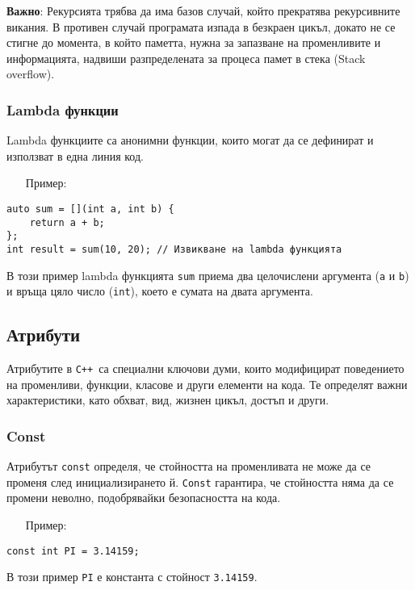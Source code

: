 \documentclass[oneside]{book}
\newcommand*{\code}[1]{\texttt{#1}}
\newcommand*{\cpp}{\texttt{C++}\ }
\begin{document}
\textbf{Важно}: Рекурсията трябва да има базов случай, който прекратява рекурсивните викания. В противен случай програмата изпада в безкраен цикъл, докато не се стигне до момента, в който паметта, нужна за запазване на променливите и информацията, надвиши разпределената за процеса памет в стека (Stack overflow).

\subsubsection{Lambda функции}
Lambda функциите са анонимни функции, които могат да се дефинират и използват в една линия код.

\begin{itemize}
    \item[Пример:]
\end{itemize} 
\begin{mdframed}\begin{lstlisting}
auto sum = [](int a, int b) {
    return a + b;
};
int result = sum(10, 20); // Извикване на lambda функцията
\end{lstlisting}\end{mdframed}
В този пример lambda функцията \code{sum} приема два целочислени аргумента (\code{a} и \code{b}) и връща цяло число (\code{int}), което е сумата на двата аргумента.

\subsection{Атрибути}
Атрибутите в \cpp са специални ключови думи, които модифицират поведението на променливи, функции, класове и други елементи на кода. Те определят важни характеристики, като обхват, вид, жизнен цикъл, достъп и други.

\subsubsection{Const}
Атрибутът \code{const} определя, че стойността на променливата не може да се променя след инициализирането й. \code{Const} гарантира, че стойността няма да се промени неволно, подобрявайки безопасността на кода.

\begin{itemize}
    \item[Пример:]
\end{itemize} 
\begin{mdframed}\begin{lstlisting}
const int PI = 3.14159;
\end{lstlisting}\end{mdframed}
В този пример \code{PI} е константа с стойност \code{3.14159}.
\end{document}
